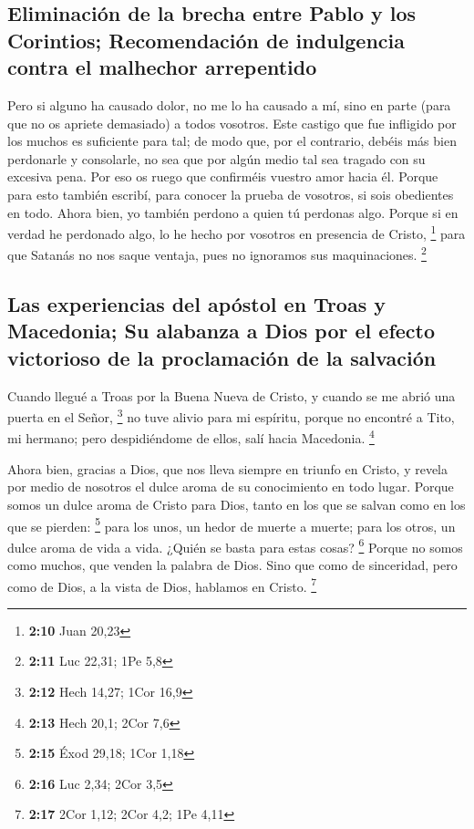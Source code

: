 \begin{paracol}{2}
{\subsection{Eliminación de la brecha entre Pablo y los Corintios;
Recomendación de indulgencia contra el malhechor
arrepentido}\label{eliminaciuxf3n-de-la-brecha-entre-pablo-y-los-corintios-recomendaciuxf3n-de-indulgencia-contra-el-malhechor-arrepentido}}

 Pero si alguno ha causado dolor, no me lo ha causado a
mí, sino en parte (para que no os apriete demasiado) a todos vosotros.
 Este castigo que fue infligido por los muchos es
suficiente para tal;  de modo que, por el contrario,
debéis más bien perdonarle y consolarle, no sea que por algún medio tal
sea tragado con su excesiva pena.  Por eso os ruego que
confirméis vuestro amor hacia él.  Porque para esto
también escribí, para conocer la prueba de vosotros, si sois obedientes
en todo.  Ahora bien, yo también perdono a quien tú
perdonas algo. Porque si en verdad he perdonado algo, lo he hecho por
vosotros en presencia de Cristo, \footnote{\textbf{2:10} Juan 20,23}
 para que Satanás no nos saque ventaja, pues no ignoramos
sus maquinaciones. \footnote{\textbf{2:11} Luc 22,31; 1Pe 5,8}

\hypertarget{las-experiencias-del-apuxf3stol-en-troas-y-macedonia-su-alabanza-a-dios-por-el-efecto-victorioso-de-la-proclamaciuxf3n-de-la-salvaciuxf3n}{%
\subsection{Las experiencias del apóstol en Troas y Macedonia; Su
alabanza a Dios por el efecto victorioso de la proclamación de la
salvación}\label{las-experiencias-del-apuxf3stol-en-troas-y-macedonia-su-alabanza-a-dios-por-el-efecto-victorioso-de-la-proclamaciuxf3n-de-la-salvaciuxf3n}}

 Cuando llegué a Troas por la Buena Nueva de Cristo, y
cuando se me abrió una puerta en el Señor, \footnote{\textbf{2:12} Hech
  14,27; 1Cor 16,9}  no tuve alivio para mi espíritu,
porque no encontré a Tito, mi hermano; pero despidiéndome de ellos, salí
hacia Macedonia. \footnote{\textbf{2:13} Hech 20,1; 2Cor 7,6}

 Ahora bien, gracias a Dios, que nos lleva siempre en
triunfo en Cristo, y revela por medio de nosotros el dulce aroma de su
conocimiento en todo lugar.  Porque somos un dulce aroma
de Cristo para Dios, tanto en los que se salvan como en los que se
pierden: \footnote{\textbf{2:15} Éxod 29,18; 1Cor 1,18} 
para los unos, un hedor de muerte a muerte; para los otros, un dulce
aroma de vida a vida. ¿Quién se basta para estas cosas? \footnote{\textbf{2:16}
  Luc 2,34; 2Cor 3,5}  Porque no somos como muchos, que
venden la palabra de Dios. Sino que como de sinceridad, pero como de
Dios, a la vista de Dios, hablamos en Cristo. \footnote{\textbf{2:17}
  2Cor 1,12; 2Cor 4,2; 1Pe 4,11}


\end{paracol}
